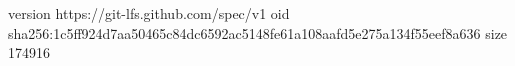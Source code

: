 version https://git-lfs.github.com/spec/v1
oid sha256:1c5ff924d7aa50465c84dc6592ac5148fe61a108aafd5e275a134f55eef8a636
size 174916
